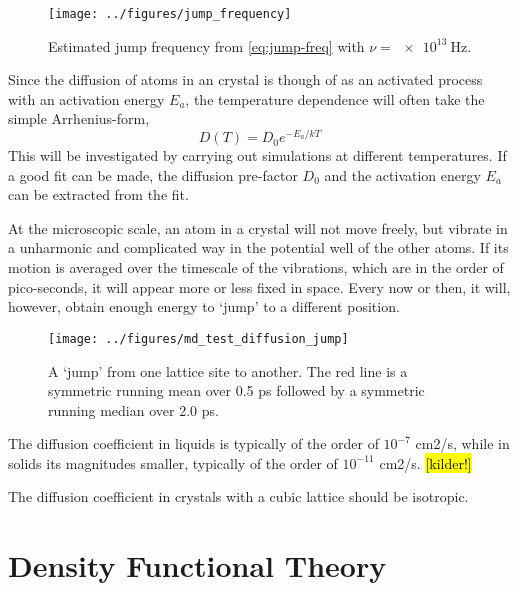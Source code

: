 \documentclass[11pt]{scrbook}   %
\newcommand{\comment}[1]{\hl{#1}}
\begin{document}
\begin{figure}[htbp]
  \begin{center}
    \texttt{[image: ../figures/jump\_frequency]}
  \end{center}
  \caption{Estimated jump frequency from \eqref{eq:jump-freq} with $\nu=\SI{e13}{\hertz}$.}
  \label{fig:../figures/jump_frequency}
\end{figure}



Since the diffusion of atoms in an crystal is though of as an activated process with an activation energy $E_a$, the temperature dependence will often take the simple Arrhenius-form,
\begin{equation}
  D(T) = D_0 e^{-E_a/kT}
\end{equation}
This will be investigated by carrying out simulations at different temperatures. 
If a good fit can be made, the diffusion pre-factor $D_0$ and the activation energy $E_a$ can be extracted from the fit.

At the microscopic scale, an atom in a crystal will not move freely, but vibrate in a unharmonic and complicated way in the potential well of the other atoms. 
If its motion is averaged over the timescale of the vibrations, which are in the order of pico-seconds, it will appear more or less fixed in space. 
Every now or then, it will, however, obtain enough energy to `jump' to a different position.

\begin{figure}[htbp]
  \begin{center}
    \texttt{[image: ../figures/md\_test\_diffusion\_jump]}
  \end{center}
  \caption{A `jump' from one lattice site to another. The red line is a symmetric running mean over 0.5 ps followed by a symmetric running median over 2.0 ps.}
  \label{fig:../figures/md_test_diffusion_jump}
\end{figure}

The diffusion coefficient in liquids is typically of the order of $10^{-7}$ cm2/s,
while in solids its magnitudes smaller, typically of the order of $10^{-11}$ cm2/s. \comment{[kilder!]}


The diffusion coefficient in crystals with a cubic lattice should be isotropic.

\chapter{Density Functional Theory}
\end{document}
